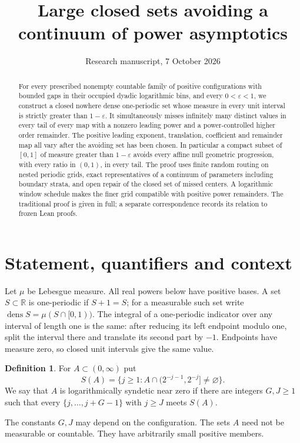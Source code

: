 \documentclass[11pt]{article}
\title{Large closed sets avoiding a continuum of power asymptotics}
\author{}
\date{Research manuscript, 7 October 2026}
\theoremstyle{definition}
\newtheorem{definition}[theorem]{Definition}
\theoremstyle{remark}
\newcommand{\R}{\mathbb R}
\newcommand{\dens}{\operatorname{dens}}
\begin{document}
\maketitle
\begin{abstract}
For every prescribed nonempty countable family of positive configurations with
bounded gaps in their occupied dyadic logarithmic bins, and every
$0<\varepsilon<1$, we construct a closed nowhere dense one-periodic set whose
measure in every unit interval is strictly greater than $1-\varepsilon$.
It simultaneously misses infinitely many distinct values in every tail of every
map with a nonzero leading power and a power-controlled higher order remainder.
The positive leading exponent, translation, coefficient and remainder map all
vary after the avoiding set has been chosen. In particular a compact subset of
$[0,1]$ of measure greater than $1-\varepsilon$ avoids every affine null geometric
progression, with every ratio in $(0,1)$, in every tail. The proof uses finite
random routing on nested periodic grids, exact representatives of a continuum
of parameters including boundary strata, and open repair of the closed set of
missed centers. A logarithmic window schedule makes the finer grid compatible
with positive power remainders. The traditional proof is given in full; a
separate correspondence records its relation to frozen Lean proofs.
\end{abstract}

\section{Statement, quantifiers and context}\label{sec:statement}
Let $\mu$ be Lebesgue measure. All real powers below have positive bases.
A set $S\subset\R$ is one-periodic if $S+1=S$; for a measurable such set write
$\dens S=\mu(S\cap[0,1))$. The integral of a one-periodic indicator over any
interval of length one is the same: after reducing its left endpoint modulo
one, split the interval there and translate its second part by $-1$.
Endpoints have measure zero, so closed unit intervals give the same value.

\begin{definition}\label{def:syndetic}
For $A\subset(0,\infty)$ put
\[
 S(A)=\{j\geq1:A\cap(2^{-j-1},2^{-j}]\ne\varnothing\}.
\]
We say that $A$ is logarithmically syndetic near zero if there are integers
$G,J\geq1$ such that every $\{j,\ldots,j+G-1\}$ with $j\geq J$ meets $S(A)$.
\end{definition}
The constants $G,J$ may depend on the configuration. The sets $A$ need not be
measurable or countable. They have arbitrarily small positive members.
\end{document}
